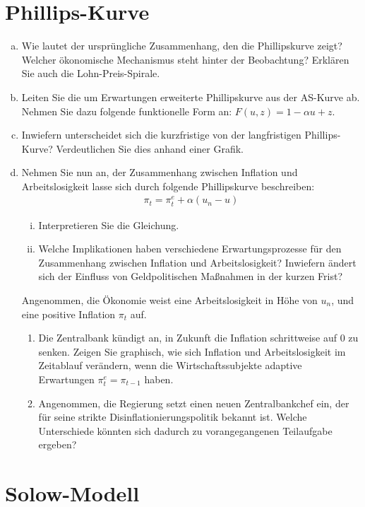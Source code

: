 \documentclass{scrartcl}
\begin{document}
\section{Phillips-Kurve}
\begin{enumerate}[a)]
  \item Wie lautet der urspr\"{u}ngliche Zusammenhang, den die Phillipskurve zeigt? Welcher \"{o}konomische Mechanismus steht hinter der Beobachtung? Erkl\"{a}ren Sie auch die Lohn-Preis-Spirale.
  \item Leiten Sie die um Erwartungen erweiterte Phillipskurve aus der AS-Kurve ab. Nehmen Sie dazu folgende funktionelle Form an: $F(u,z) = 1-\alpha u +z$.
  \item Inwiefern unterscheidet sich die kurzfristige von der langfristigen Phillips-Kurve? Verdeutlichen Sie dies anhand einer Grafik.
  \item Nehmen Sie nun an, der Zusammenhang zwischen Inflation und Arbeitslosigkeit lasse sich durch folgende Phillipskurve beschreiben:
  \begin{align*}
    \pi_t = \pi_t^e + \alpha(u_n-u)
  \end{align*}
    \begin{enumerate}[(i)]
    \item Interpretieren Sie die Gleichung.
    \item Welche Implikationen haben verschiedene Erwartungsprozesse f\"{u}r den Zusammenhang zwischen Inflation und Arbeitslosigkeit? Inwiefern \"{a}ndert sich der Einfluss von Geldpolitischen Ma{\ss}nahmen in der kurzen Frist?
    \end{enumerate}
Angenommen, die Ökonomie weist eine Arbeitslosigkeit in Höhe von $u_n$, und eine positive Inflation $\pi_t$ auf.
\begin{enumerate}
	\item Die Zentralbank kündigt an, in Zukunft die Inflation schrittweise auf 0 zu senken. Zeigen Sie graphisch, wie sich Inflation und Arbeitslosigkeit im Zeitablauf verändern, wenn die Wirtschaftssubjekte adaptive Erwartungen $\pi_t^e=\pi_{t-1}$ haben.
	\item Angenommen, die Regierung setzt einen neuen Zentralbankchef ein, der für seine strikte Disinflationierungspolitik bekannt ist. Welche Unterschiede könnten sich dadurch zu vorangegangenen Teilaufgabe ergeben?
\end{enumerate}
\end{enumerate}

\section{Solow-Modell}
\end{document}
